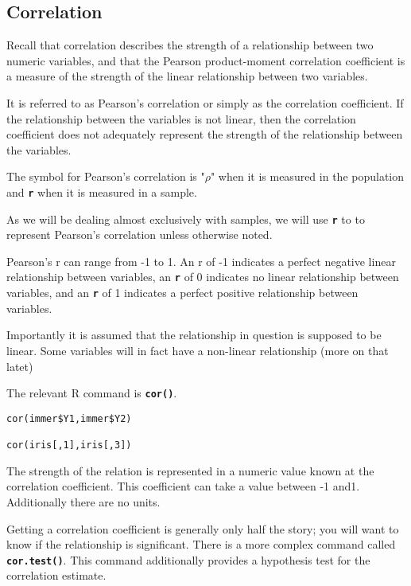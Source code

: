 \documentclass[a4paper,12pt]{article}
\begin{document}
\subsection{Correlation}
Recall that correlation describes the strength of a relationship between two numeric variables, and that the Pearson product-moment correlation coefficient is a measure of the strength of the linear relationship between two variables.

It is referred to as Pearson's correlation or simply as the correlation coefficient. If the relationship between the variables is not linear, then the correlation coefficient does not adequately represent the strength of the relationship between the variables.

The symbol for Pearson's correlation is "$\rho$" when it is measured in the population and \texttt{\textbf{r}} when it is measured in a sample.

As we will be dealing almost exclusively with samples, we will use \texttt{\textbf{r}} to to represent Pearson's correlation unless otherwise noted.

Pearson's r can range from -1 to 1. An r of -1 indicates a perfect negative linear relationship between variables, an \texttt{\textbf{r}} of 0 indicates no linear relationship between variables, and an \texttt{\textbf{r}} of 1 indicates a perfect positive relationship between variables.

Importantly it is assumed that the relationship in question is supposed to be linear. Some variables will in fact have a non-linear relationship (more on that latet)

The relevant R command is \texttt{\textbf{cor()}}.


\begin{framed}
\begin{verbatim}
cor(immer$Y1,immer$Y2)

cor(iris[,1],iris[,3])
\end{verbatim}
\end{framed}
The strength of the relation is represented in a numeric value known at the correlation coefficient. This coefficient can take a value between -1 and1. Additionally there are no units.

Getting a correlation coefficient is generally only half the story; you will want to know if the relationship is significant. There is a more complex command called \texttt{\textbf{cor.test()}}. This command additionally provides a hypothesis test for the correlation estimate.
\end{document}
